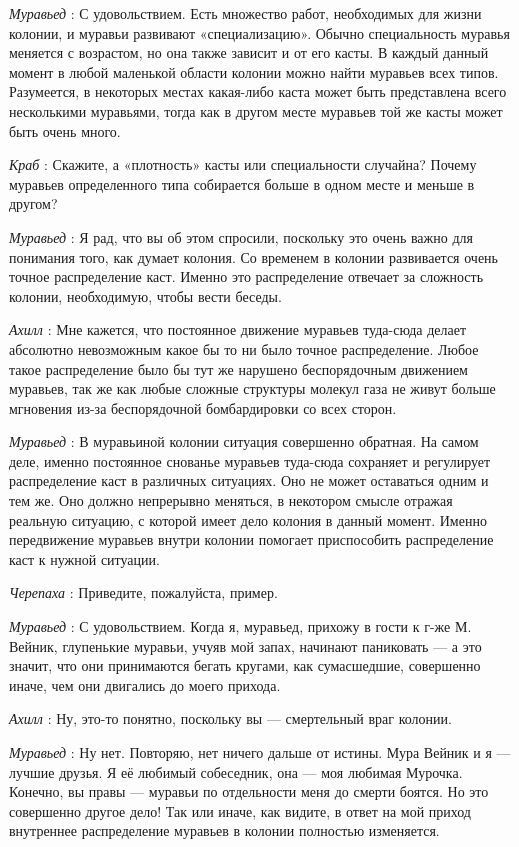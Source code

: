 \documentclass[../main.tex]{subfiles}
\begin{document}
\begin{dialogue}
\emph{Муравьед} : С удовольствием. Есть множество работ, необходимых для жизни колонии, и муравьи развивают «специализацию». Обычно специальность муравья меняется с возрастом, но она также зависит и от его касты. В каждый данный момент в любой маленькой области колонии можно найти муравьев всех типов. Разумеется, в некоторых местах какая-либо каста может быть представлена всего несколькими муравьями, тогда как в другом месте муравьев той же касты может быть очень много.

\emph{Краб} : Скажите, а «плотность» касты или специальности случайна? Почему муравьев определенного типа собирается больше в одном месте и меньше в другом?

\emph{Муравьед} : Я рад, что вы об этом спросили, поскольку это очень важно для понимания того, как думает колония. Со временем в колонии развивается очень точное распределение каст. Именно это распределение отвечает за сложность колонии, необходимую, чтобы вести беседы.

\emph{Ахилл} : Мне кажется, что постоянное движение муравьев туда-сюда делает абсолютно невозможным какое бы то ни было точное распределение. Любое такое распределение было бы тут же нарушено беспорядочным движением муравьев, так же как любые сложные структуры молекул газа не живут больше мгновения из-за беспорядочной бомбардировки со всех сторон.

\emph{Муравьед} : В муравьиной колонии ситуация совершенно обратная. На самом деле, именно постоянное снованье муравьев туда-сюда сохраняет и регулирует распределение каст в различных ситуациях. Оно не может оставаться одним и тем же. Оно должно непрерывно меняться, в некотором смысле отражая реальную ситуацию, с которой имеет дело колония в данный момент. Именно передвижение муравьев внутри колонии помогает приспособить распределение каст к нужной ситуации.

\emph{Черепаха} : Приведите, пожалуйста, пример.

\emph{Муравьед} : С удовольствием. Когда я, муравьед, прихожу в гости к г-же М. Вейник, глупенькие муравьи, учуяв мой запах, начинают паниковать --- а это значит, что они принимаются бегать кругами, как сумасшедшие, совершенно иначе, чем они двигались до моего прихода.

\emph{Ахилл} : Ну, это-то понятно, поскольку вы --- смертельный враг колонии.

\emph{Муравьед} : Ну нет. Повторяю, нет ничего дальше от истины. Мура Вейник и я --- лучшие друзья. Я её любимый собеседник, она --- моя любимая Мурочка. Конечно, вы правы --- муравьи по отдельности меня до смерти боятся. Но это совершенно другое дело! Так или иначе, как видите, в ответ на мой приход внутреннее распределение муравьев в колонии полностью изменяется.


\end{dialogue}
\end{document}
